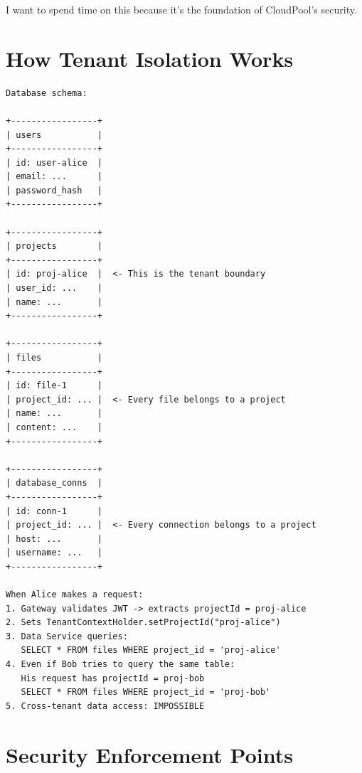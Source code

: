 \documentclass[11pt,a4paper]{report}
\begin{document}
I want to spend time on this because it's the foundation of CloudPool's security.


\section{How Tenant Isolation Works}


\begin{lstlisting}[language=text]
Database schema:

+-----------------+
| users           |
+-----------------+
| id: user-alice  |
| email: ...      |
| password_hash   |
+-----------------+

+-----------------+
| projects        |
+-----------------+
| id: proj-alice  |  <- This is the tenant boundary
| user_id: ...    |
| name: ...       |
+-----------------+

+-----------------+
| files           |
+-----------------+
| id: file-1      |
| project_id: ... |  <- Every file belongs to a project
| name: ...       |
| content: ...    |
+-----------------+

+-----------------+
| database_conns  |
+-----------------+
| id: conn-1      |
| project_id: ... |  <- Every connection belongs to a project
| host: ...       |
| username: ...   |
+-----------------+

When Alice makes a request:
1. Gateway validates JWT -> extracts projectId = proj-alice
2. Sets TenantContextHolder.setProjectId("proj-alice")
3. Data Service queries:
   SELECT * FROM files WHERE project_id = 'proj-alice'
4. Even if Bob tries to query the same table:
   His request has projectId = proj-bob
   SELECT * FROM files WHERE project_id = 'proj-bob'
5. Cross-tenant data access: IMPOSSIBLE
\end{lstlisting}


\section{Security Enforcement Points}
\end{document}
